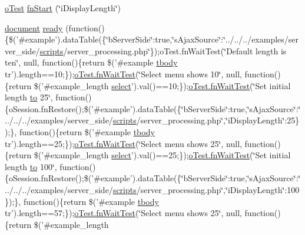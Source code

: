 \begin{DoxyCompactItemize}
\item 
\hyperlink{unit__test_8js_a3b2d259e2df3b6860d9047a92d09d0d6}{o\+Test} \hyperlink{4__server-side_2i_display_length_8js_a78c915607eaf6704cc816a7d1154376e}{fn\+Start} (\char`\"{}i\+Display\+Length\char`\"{})
\item 
\hyperlink{outside_events_8js_aa14f8e0338cced6720590fd2ea13bd4b}{document} \hyperlink{4__server-side_2i_display_length_8js_a77265a4794bfdc8c178454aa27adc989}{ready} (function()\{\$('\#example').data\+Table(\{\char`\"{}b\+Server\+Side\char`\"{}\+:true,\char`\"{}s\+Ajax\+Source\char`\"{}\+:\char`\"{}../../../examples/server\+\_\+side/\hyperlink{tinymce_8jquery_8dev_8js_a09066d4d580eeec222f858d588b4cdef}{scripts}/server\+\_\+processing.\+php\char`\"{}\});o\+Test.\+fn\+Wait\+Test(\char`\"{}Default length is ten\char`\"{}, null, function()\{return \$('\#example \hyperlink{core_8constructor_8js_a99b0542c7c50fe8757c55bf9dac5f3be}{tbody} tr').length==10;\});\hyperlink{onhold_24__server-side_2__zero__config_8js_ab25c4d596771c0133cdc45178ce72c3d}{o\+Test.\+fn\+Wait\+Test}(\char`\"{}Select menu shows 10\char`\"{}, null, function()\{return \$('\#example\+\_\+length \hyperlink{validate_8js_a107b4864f70df98ef4a521c0b2bc80c7}{select}').val()==10;\});\hyperlink{onhold_24__server-side_2__zero__config_8js_ab25c4d596771c0133cdc45178ce72c3d}{o\+Test.\+fn\+Wait\+Test}(\char`\"{}Set initial length \hyperlink{jquery-ui_8js_af6086621f45baa2cf538f19e45d3c263}{to} 25\char`\"{}, function()\{o\+Session.\+fn\+Restore();\$('\#example').data\+Table(\{\char`\"{}b\+Server\+Side\char`\"{}\+:true,\char`\"{}s\+Ajax\+Source\char`\"{}\+:\char`\"{}../../../examples/server\+\_\+side/\hyperlink{tinymce_8jquery_8dev_8js_a09066d4d580eeec222f858d588b4cdef}{scripts}/server\+\_\+processing.\+php\char`\"{},\char`\"{}i\+Display\+Length\char`\"{}\+:25\});\}, function()\{return \$('\#example \hyperlink{core_8constructor_8js_a99b0542c7c50fe8757c55bf9dac5f3be}{tbody} tr').length==25;\});\hyperlink{onhold_24__server-side_2__zero__config_8js_ab25c4d596771c0133cdc45178ce72c3d}{o\+Test.\+fn\+Wait\+Test}(\char`\"{}Select menu shows 25\char`\"{}, null, function()\{return \$('\#example\+\_\+length \hyperlink{validate_8js_a107b4864f70df98ef4a521c0b2bc80c7}{select}').val()==25;\});\hyperlink{onhold_24__server-side_2__zero__config_8js_ab25c4d596771c0133cdc45178ce72c3d}{o\+Test.\+fn\+Wait\+Test}(\char`\"{}Set initial length \hyperlink{jquery-ui_8js_af6086621f45baa2cf538f19e45d3c263}{to} 100\char`\"{}, function()\{o\+Session.\+fn\+Restore();\$('\#example').data\+Table(\{\char`\"{}b\+Server\+Side\char`\"{}\+:true,\char`\"{}s\+Ajax\+Source\char`\"{}\+:\char`\"{}../../../examples/server\+\_\+side/\hyperlink{tinymce_8jquery_8dev_8js_a09066d4d580eeec222f858d588b4cdef}{scripts}/server\+\_\+processing.\+php\char`\"{},\char`\"{}i\+Display\+Length\char`\"{}\+:100\});\}, function()\{return \$('\#example \hyperlink{core_8constructor_8js_a99b0542c7c50fe8757c55bf9dac5f3be}{tbody} tr').length==57;\});\hyperlink{onhold_24__server-side_2__zero__config_8js_ab25c4d596771c0133cdc45178ce72c3d}{o\+Test.\+fn\+Wait\+Test}(\char`\"{}Select menu shows 25\char`\"{}, null, function()\{return \$('\#example\+\_\+length 
\end{DoxyCompactItemize}
